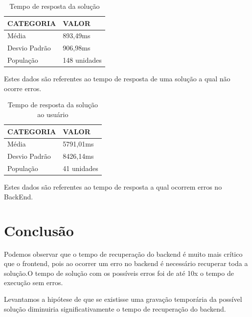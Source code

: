 \documentclass[12pt]{article}
\begin{document}
\begin{table}[H]
    \centering
    \caption{Tempo de resposta da solução}
    \label{my-label}
    \begin{tabular}{|l|l|}
    \hline
    CATEGORIA     & VALOR        \\ \hline
    Média         & 893,49ms    \\ \hline
    Desvio Padrão & 906,98ms    \\ \hline
    População     & 148 unidades  \\ \hline
    \end{tabular}
\end{table}

Estes dados são referentes ao tempo de resposta de uma solução a qual não ocorre erros.

\begin{table}[H]
    \centering
    \caption{Tempo de resposta da solução ao usuário}
    \label{my-label}
    \begin{tabular}{|l|l|}
    \hline
    CATEGORIA     & VALOR        \\ \hline
    Média         & 5791,01ms    \\ \hline
    Desvio Padrão & 8426,14ms    \\ \hline
    População     & 41 unidades  \\ \hline
    \end{tabular}
\end{table}

Estes dados são referentes ao tempo de resposta a qual ocorrem erros no BackEnd.
\section{Conclusão}

Podemos observar que o tempo de recuperação do backend é muito mais crítico que o frontend, pois ao ocorrer um erro no backend é necessário recuperar toda a solução.O tempo de solução com os possíveis erros foi de até 10x o tempo de execução sem erros.

 Levantamos a hipótese de que se existisse uma gravação temporária da possível solução diminuiria significativamente o tempo de recuperação do backend.



\end{document}
